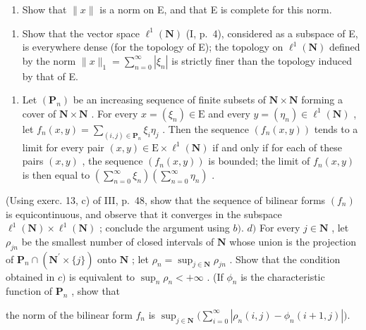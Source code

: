 \begin{enumerate}
\def\labelenumi{\alph{enumi})}
\tightlist
\item
  Show that \(\| x\|\) is a norm on E, and that E is complete for this norm.
\end{enumerate}

\begin{enumerate}
\def\labelenumi{\alph{enumi})}
\setcounter{enumi}{1}
\tightlist
\item
  Show that the vector space \(\ell^1 (\mathbf{N})\) (I, p.~4), considered as a subspace of E, is everywhere dense (for the topology of E); the topology on \(\ell^1 (\mathbf{N})\) defined by the norm \(\| x\| _1 = \sum_{n = 0}^{\infty}|\xi_n|\) is strictly finer than the topology induced by that of E.
\end{enumerate}

\begin{enumerate}
\def\labelenumi{\alph{enumi})}
\setcounter{enumi}{2}
\tightlist
\item
  Let \((\mathbf{P}_n)\) be an increasing sequence of finite subsets of \(\mathbf{N} \times \mathbf{N}\) forming a cover of \(\mathbf{N} \times \mathbf{N}\) . For every \(x = (\xi_n) \in \mathrm{E}\) and every \(y = (\eta_n) \in \ell^1(\mathbf{N})\) , let \(f_n(x, y) = \sum_{(i,j) \in \mathbf{P}_n} \xi_i \eta_j\) . Then the sequence \((f_n(x, y))\) tends to a limit for every pair \((x, y) \in \mathrm{E} \times \ell^1(\mathbf{N})\) if and only if for each of these pairs \((x, y)\) , the sequence \((f_n(x, y))\) is bounded; the limit of \(f_n(x, y)\) is then equal to \(\left(\sum_{n=0}^{\infty} \xi_n\right) \left(\sum_{n=0}^{\infty} \eta_n\right)\) .
\end{enumerate}

(Using exerc. 13, c) of III, p.~48, show that the sequence of bilinear forms \((f_n)\) is equicontinuous, and observe that it converges in the subspace \(\ell^1 (\mathbf{N})\times \ell^1 (\mathbf{N})\) ; conclude the argument using \(b).\) \(d)\) For every \(j\in \mathbf{N}\) , let \(\rho_{jn}\) be the smallest number of closed intervals of \(\mathbf{N}\) whose union is the projection of \(\mathbf{P}_n\cap (\mathbf{N}^{\prime}\times \{j\})\) onto \(\mathbf{N}\) ; let \(\rho_{n} = \sup_{j\in \mathbf{N}}\rho_{jn}\) . Show that the condition obtained in \(c)\) is equivalent to \(\sup_n\rho_n < + \infty\) . (If \(\phi_n\) is the characteristic function of \(\mathbf{P}_n\) , show that

the norm of the bilinear form \(f_{n}\) is \(\sup_{j\in \mathbf{N}}\big(\sum_{i = 0}^{\infty}|\rho_n(i,j) - \phi_n(i + 1,j)|\big).\)

